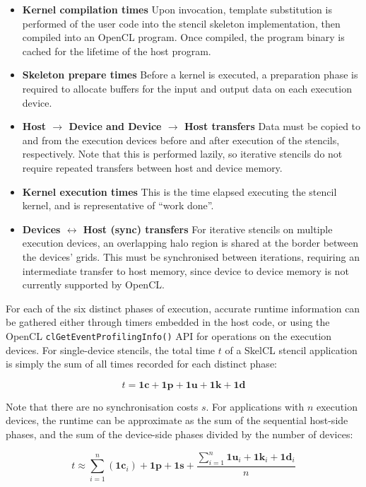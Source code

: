 \begin{itemize}
\item \textbf{Kernel compilation times} Upon invocation, template
  substitution is performed of the user code into the stencil skeleton
  implementation, then compiled into an OpenCL program. Once compiled,
  the program binary is cached for the lifetime of the host program.
\item \textbf{Skeleton prepare times} Before a kernel is executed, a
  preparation phase is required to allocate buffers for the input and
  output data on each execution device.
\item \textbf{Host $\rightarrow$ Device and Device $\rightarrow$ Host
    transfers} Data must be copied to and from the execution devices
  before and after execution of the stencils, respectively. Note that
  this is performed lazily, so iterative stencils do not require
  repeated transfers between host and device memory.
\item \textbf{Kernel execution times} This is the time elapsed
  executing the stencil kernel, and is representative of ``work
  done''.
\item \textbf{Devices $\leftrightarrow$ Host (sync) transfers} For
  iterative stencils on multiple execution devices, an overlapping
  halo region is shared at the border between the devices' grids. This
  must be synchronised between iterations, requiring an intermediate
  transfer to host memory, since device to device memory is not
  currently supported by OpenCL.
\end{itemize}

For each of the six distinct phases of execution, accurate runtime
information can be gathered either through timers embedded in the host
code, or using the OpenCL \texttt{clGetEventProfilingInfo()} API for
operations on the execution devices. For single-device stencils, the
total time $t$ of a SkelCL stencil application is simply the sum of
all times recorded for each distinct phase:

\begin{equation}
t = \bm{1c} + \bm{1p} + \bm{1u} + \bm{1k} + \bm{1d}
\end{equation}

Note that there are no synchronisation costs $s$. For applications
with $n$ execution devices, the runtime can be approximate as the sum
of the sequential host-side phases, and the sum of the device-side
phases divided by the number of devices:

\begin{equation}
t \approx \sum_{i=1}^n{(\bm{1c}_{i})} + \bm{1p} + \bm{1s} +
  \frac{\sum_{i=1}^n{\bm{1u}_{i} + \bm{1k}_{i} + \bm{1d}_{i}}}{n}
\end{equation}

